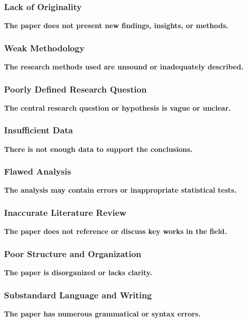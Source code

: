 \documentclass[handout]{beamer}
\begin{document}
\begin{frame}[plain]
\centering
\frametitle{Lack of Originality}
\begin{framed}
\Large\textbf{The paper does not present new findings, insights, or methods.}
\end{framed}
\end{frame}
\begin{frame}[plain]
\centering
\frametitle{Weak Methodology}
\begin{framed}
\Large\textbf{The research methods used are unsound or inadequately described.}
\end{framed}
\end{frame}
\begin{frame}[plain]
\centering
\frametitle{Poorly Defined Research Question}
\begin{framed}
\Large\textbf{The central research question or hypothesis is vague or unclear.}
\end{framed}
\end{frame}
\begin{frame}[plain]
\centering
\frametitle{Insufficient Data}
\begin{framed}
\Large\textbf{There is not enough data to support the conclusions.}
\end{framed}
\end{frame}
\begin{frame}[plain]
\centering
\frametitle{Flawed Analysis}
\begin{framed}
\Large\textbf{The analysis may contain errors or inappropriate statistical tests.}
\end{framed}
\end{frame}
\begin{frame}[plain]
\centering
\frametitle{Inaccurate Literature Review}
\begin{framed}
\Large\textbf{The paper does not reference or discuss key works in the field.}
\end{framed}
\end{frame}
\begin{frame}[plain]
\centering
\frametitle{Poor Structure and Organization}
\begin{framed}
\Large\textbf{The paper is disorganized or lacks clarity.}
\end{framed}
\end{frame}
\begin{frame}[plain]
\centering
\frametitle{Substandard Language and Writing}
\begin{framed}
\Large\textbf{The paper has numerous grammatical or syntax errors.}
\end{framed}
\end{frame}
\end{document}
